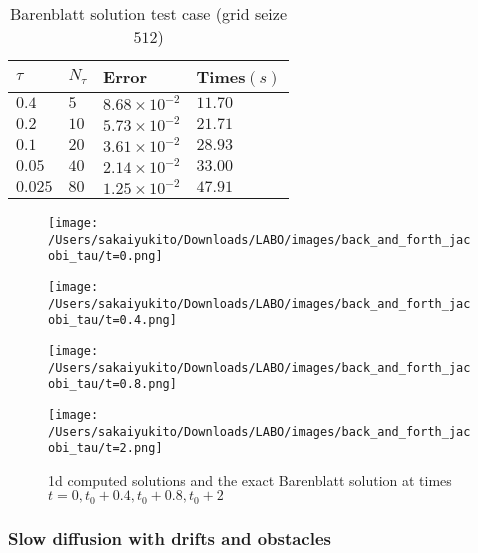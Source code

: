 \documentclass{jsarticle}
\theoremstyle{definition}
\begin{document}
\begin{table}[hbtp]
    \caption{Barenblatt solution test case (grid seize $512$)}
    \label{table:data_type}
    \centering
    \begin{tabular}{llll}
        \hline
        $\tau$  & $N_\tau$  &  Error & Times$(s)$  \\
        \hline \hline
        $0.4$   & $5$   & $8.68 \times 10^{-2}$  & $11.70$\\
        $0.2$   & $10$  & $5.73 \times 10^{-2}$  & $21.71$\\
        $0.1$   & $20$  & $3.61 \times 10^{-2}$  & $28.93$\\
        $0.05$  & $40$  & $2.14 \times 10^{-2}$  & $33.00$\\
        $0.025$ & $80$  & $1.25 \times 10^{-2}$  & $47.91$\\
        \hline
    \end{tabular}
\end{table}

  \begin{figure}
    \centering
    \begin{minipage}{0.4\hsize}
        \texttt{[image: /Users/sakaiyukito/Downloads/LABO/images/back\_and\_forth\_jacobi\_tau/t=0.png]}
        \caption{$t = 0$}
    \end{minipage}
    \begin{minipage}{0.4\hsize}
        \texttt{[image: /Users/sakaiyukito/Downloads/LABO/images/back\_and\_forth\_jacobi\_tau/t=0.4.png]}
        \caption{$t = 0.4$}
    \end{minipage}
    \begin{minipage}{0.4\hsize}
        \texttt{[image: /Users/sakaiyukito/Downloads/LABO/images/back\_and\_forth\_jacobi\_tau/t=0.8.png]}
        \caption{$t = 0.8$}
    \end{minipage}
    \begin{minipage}{0.4\hsize}
        \texttt{[image: /Users/sakaiyukito/Downloads/LABO/images/back\_and\_forth\_jacobi\_tau/t=2.png]}
        \caption{$t = 2$}
    \end{minipage}
    \caption{1d computed solutions and the exact Barenblatt solution at times $t  = 0, t_0 + 0.4, t_0 + 0.8, t_0 + 2$}
\end{figure}

\subsubsection{Slow diffusion with drifts and obstacles}
\end{document}
